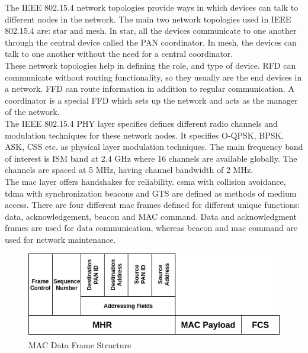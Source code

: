 The IEEE 802.15.4 network topologies provide ways in which devices can talk to different nodes in the network.
The main two network topologies used in IEEE 802.15.4 are: star and mesh.
In star, all the devices communicate to one another through the central device called the \ac{PAN} coordinator.
In mesh, the devices can talk to one another without the need for a central coordinator.\\

These network topologies help in defining the role, and type of device.
\ac{RFD} can communicate without routing functionality, so they usually are the end devices in a network.
\ac{FFD} can route information in addition to regular communication.
A coordinator is a special \ac{FFD} which sets up the network and acts as the manager of the network.\\

The IEEE 802.15.4 \ac{PHY} layer specifies defines different radio channels and modulation techniques for these network nodes.
It specifies \ac{O-QPSK}, \ac{BPSK}, \ac{ASK}, \ac{CSS} etc. as physical layer modulation techniques.
The main frequency band of interest is ISM band at 2.4 GHz where 16 channels are available globally.
The channels are spaced at 5 MHz, having channel bandwidth of 2 MHz.\\

The \ac{mac} layer offers handshakes for reliability.
\ac{csma} with collision avoidance, \ac{tdma} with synchronization beacons and \ac{GTS} are defined as methods of medium access.
There are four different \ac{mac} frames defined for different unique functions: data, acknowledgement, beacon and MAC command.
Data and acknowledgment frames are used for data communication, whereas beacon and \ac{mac} command are used for network maintenance.\\

\begin{figure}[h!]
\centering
\includegraphics[scale=0.6]{Figure/DataFrame.png}
\caption{MAC Data Frame Structure}
\label{data_frame}
\end{figure}

